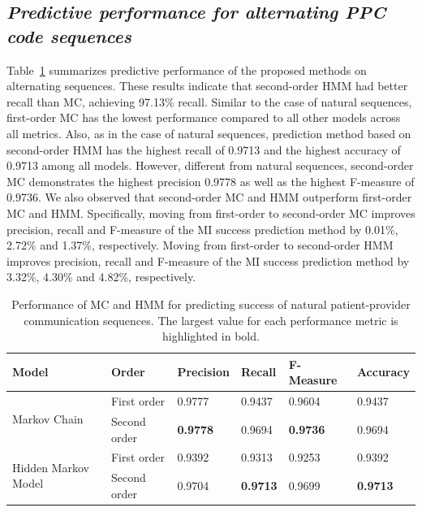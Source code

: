 \documentclass{amia}
\begin{document}
\subsection*{\textit{Predictive performance for alternating PPC code sequences}}
Table~\ref{tab:result_alt_seq} summarizes predictive performance of the proposed methods on alternating sequences. These results indicate that second-order HMM had better recall than MC, achieving 97.13\% recall. Similar to the case of natural sequences, first-order MC has the lowest performance compared to all other models across all metrics. Also, as in the case of natural sequences, prediction method based on second-order HMM has the highest recall of 0.9713 and the highest accuracy of 0.9713 among all models. However, different from natural sequences, second-order MC demonstrates the highest precision 0.9778 as well as the highest F-measure of 0.9736. We also observed that second-order MC and HMM outperform first-order MC and HMM. Specifically, moving from first-order to second-order MC improves precision, recall and F-measure of the MI success prediction method by 0.01\%, 2.72\% and 1.37\%, respectively. Moving from first-order to second-order HMM improves precision, recall and F-measure of the MI success prediction method by 3.32\%, 4.30\% and 4.82\%, respectively.\\

\begin{table}[h]
\centering
\caption{Performance of MC and HMM for predicting success of natural patient-provider communication sequences. The largest value for each performance metric is highlighted in bold.}
\label{tab:result_alt_seq}
  \begin{tabular}{|l|l|l|l|l|l|}
  \hline
   \textbf{Model} & \textbf{Order}  & \textbf{Precision}  & \textbf{Recall} & \textbf{F-Measure} & \textbf{Accuracy}\\ \hline    
    
 \multirow{2}{*}{Markov Chain} & First order & 0.9777 & 0.9437 & 0.9604 & 0.9437\\\cline{2-6}
 & Second order & \textbf{0.9778} & 0.9694 & \textbf{0.9736} & 0.9694\\ \hline
 \multirow{2}{*}{Hidden Markov Model} & First order & 0.9392 & 0.9313 & 0.9253 & 0.9392\\ \cline{2-6}
 & Second order & 0.9704 & \textbf{0.9713} & 0.9699  & \textbf{0.9713}\\ \hline
  \end{tabular}
\end{table}
\end{document}
